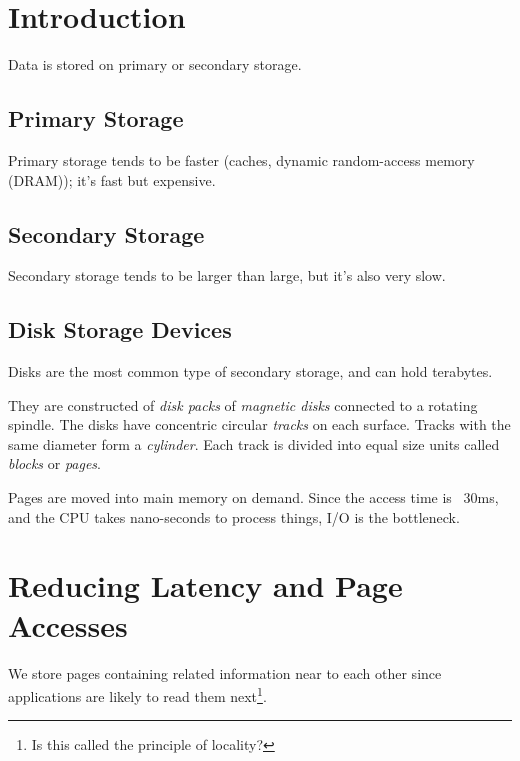             \section{Introduction} %
            \label{sec:introduction}
                Data is stored on primary or secondary storage.
                \subsection{Primary Storage} %
                \label{sub:primary_storage}
                    Primary storage tends to be faster (caches, dynamic random-access memory (DRAM)); it's fast but expensive.
                \subsection{Secondary Storage} %
                \label{sub:secondary_storage}
                    Secondary storage tends to be larger than large, but it's also very slow.
                \subsection{Disk Storage Devices} %
                \label{sub:disk_storage_devices}
                    Disks are the most common type of secondary storage, and can hold terabytes.

                    They are constructed of \textit{disk packs} of \textit{magnetic disks} connected to a rotating spindle.
                    The disks have concentric circular \textit{tracks} on each surface.
                    Tracks with the same diameter form a \textit{cylinder}.
                    Each track is divided into equal size units called \textit{blocks} or \textit{pages}.

                    Pages are moved into main memory on demand.
                    Since the access time is ~$30$ms, and the CPU takes nano-seconds to process things, I/O is the bottleneck.
            \section{Reducing Latency and Page Accesses} %
            \label{sec:reducing_latency_and_page_accesses}
                We store pages containing related information near to each other since applications are likely to read them next\footnote{Is this called the principle of locality?}.
